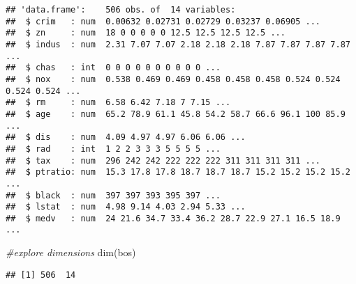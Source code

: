 \documentclass[
]{article}
\newenvironment{Shaded}{\begin{snugshade}}{\end{snugshade}}
\newcommand{\CommentTok}[1]{\textcolor[rgb]{0.56,0.35,0.01}{\textit{#1}}}
\newcommand{\FunctionTok}[1]{\textcolor[rgb]{0.00,0.00,0.00}{#1}}
\newcommand{\NormalTok}[1]{#1}
\begin{document}
\begin{verbatim}
## 'data.frame':    506 obs. of  14 variables:
##  $ crim   : num  0.00632 0.02731 0.02729 0.03237 0.06905 ...
##  $ zn     : num  18 0 0 0 0 0 12.5 12.5 12.5 12.5 ...
##  $ indus  : num  2.31 7.07 7.07 2.18 2.18 2.18 7.87 7.87 7.87 7.87 ...
##  $ chas   : int  0 0 0 0 0 0 0 0 0 0 ...
##  $ nox    : num  0.538 0.469 0.469 0.458 0.458 0.458 0.524 0.524 0.524 0.524 ...
##  $ rm     : num  6.58 6.42 7.18 7 7.15 ...
##  $ age    : num  65.2 78.9 61.1 45.8 54.2 58.7 66.6 96.1 100 85.9 ...
##  $ dis    : num  4.09 4.97 4.97 6.06 6.06 ...
##  $ rad    : int  1 2 2 3 3 3 5 5 5 5 ...
##  $ tax    : num  296 242 242 222 222 222 311 311 311 311 ...
##  $ ptratio: num  15.3 17.8 17.8 18.7 18.7 18.7 15.2 15.2 15.2 15.2 ...
##  $ black  : num  397 397 393 395 397 ...
##  $ lstat  : num  4.98 9.14 4.03 2.94 5.33 ...
##  $ medv   : num  24 21.6 34.7 33.4 36.2 28.7 22.9 27.1 16.5 18.9 ...
\end{verbatim}

\begin{Shaded}
\begin{Highlighting}[]
\CommentTok{\#explore dimensions}
\FunctionTok{dim}\NormalTok{(bos)}
\end{Highlighting}
\end{Shaded}

\begin{verbatim}
## [1] 506  14
\end{verbatim}
\end{document}
